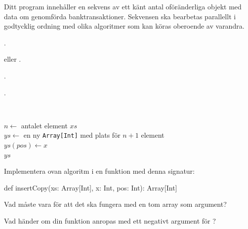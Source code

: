 {\Subtask Ditt program innehåller en sekvens av ett känt antal oföränderliga objekt med data om genomförda banktransaktioner. Sekvensen ska bearbetas parallellt i godtycklig ordning med olika algoritmer som kan köras oberoende av varandra.


\ExtraTasks %

\SOLUTION


\TaskSolved \what


\SubtaskSolved  {}.

\SubtaskSolved  {} eller .

\SubtaskSolved  {}.

\SubtaskSolved  {}.



\ExtraTasks %


\QUESTEND









\QUESTBEGIN

\Task  \what~

\begin{algorithm}[H]

 $n \leftarrow$ antalet element $xs$\\
 $ys \leftarrow$ en ny \texttt{Array[Int]} med plats för $n+1$ element \\
 $ys(pos) \leftarrow x$ \\
 \Return $ys$
\end{algorithm}

\Subtask Implementera ovan algoritm i en funktion med denna signatur:
\begin{Code}
def insertCopy(xs: Array[Int], x: Int, pos: Int): Array[Int]
\end{Code}

\Subtask Vad måste  vara för att det ska fungera med en tom array som argument?

\Subtask Vad händer om din funktion anropas med ett negativt argument för ?

}
